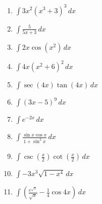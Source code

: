 \documentclass[12pt]{article}
\newif\ifans
\begin{document}
\begin{enumerate}

\item $\int 3x^2(x^3+3)^3 \,dx$ 

\ifans{\fbox{$\frac{1}{4}(x^3+3)^4+C$}} \fi

\item $\int \frac{5}{5x+3} \,dx$ 

\ifans{\fbox{$\ln{|5x+3|}+C$}} \fi

\item $\int 2x\cos{(x^2)} \,dx$ 

\ifans{\fbox{$\sin{(x^2)}+C$}} \fi

\item $\int 4x(x^2+6)^2 \,dx$ 

\ifans{\fbox{$\frac{2}{3}(x^2+6)^3+C$}} \fi

\item $\int \sec{(4x)}\tan{(4x)} \,dx$ 

\ifans{\fbox{$\frac{1}{4}\sec{(4x)}+C$}} \fi

\item $\int (3x-5)^{9} \,dx$ 

\ifans{\fbox{$\frac{1}{30}(3x-5)^{10}+C$}} \fi

\item $\int e^{-2x} \,dx$ 

\ifans{\fbox{$-\frac{1}{2}e^{-2x}+C$}} \fi

\item $\int \frac{\sin{x}\cos{x}}{1+\sin^{2}{x}} \,dx$ 

\ifans{\fbox{$\frac{1}{2}\ln{(1+\sin^2{x}})+C$}} \fi

\item $\int \csc{\left(\frac{x}{2}\right)}\cot{\left(\frac{x}{2}\right)} \,dx$ 

\ifans{\fbox{$-2\csc{\left(\frac{x}{2}\right)}+C$}} \fi

\item $\int -3x^3\sqrt{1-x^4} \,dx$ 

\ifans{\fbox{\parbox{1\linewidth}{$\frac{1}{2}(1-x^{4})^{\frac{3}{2}}+C$; %
Video Solution: \textcolor{blue}{\href{https://www.youtube.com/watch?v=6EqONIlA0Vc}{https://www.youtube.com/watch?v=6EqONIlA0Vc}}}}} \fi

\item $\int \left(\frac{e^{\sqrt{x}}}{\sqrt{x}}-\frac{1}{4}\cos{4x}\right) \,dx$ 


\end{enumerate}
\end{document}
